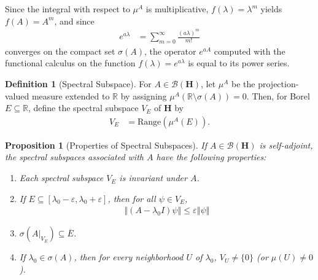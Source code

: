 \documentclass[10pt]{extarticle}
\newcommand{\R}{\mathbb{R}}
\newcommand{\norm}[1]{\left\Vert #1\right\Vert}
\theoremstyle{plain}
\newtheorem*{proposition}{Proposition}%
\theoremstyle{definition}
\newtheorem*{definition}{Definition}
\theoremstyle{remark}
\begin{document}
  Since the integral with respect to $\mu^{A}$ is multiplicative, $f(\lambda) = \lambda^{m}$ yields $f(A) = A^{m}$, and since
  \begin{align*}
    e^{a\lambda} &= \sum_{m=0}^{\infty}\frac{(a\lambda)^{m}}{m!}
  \end{align*}
  converges on the compact set $\sigma(A)$, the operator $e^{aA}$ computed with the functional calculus on the function $f(\lambda) = e^{a\lambda}$ is equal to its power series.
  \begin{definition}[Spectral Subspace]
    For $A\in \mathcal{B}\left(\mathbf{H}\right)$, let $\mu^{A}$ be the projection-valued measure extended to $\R$ by assigning $\mu^{A}\left(\R\setminus \sigma(A)\right) = 0$. Then, for Borel $E\subseteq \R$, define the spectral subspace $V_E$ of $\mathbf{H}$ by
    \begin{align*}
      V_E &= \text{Range}\left(\mu^{A}\left(E\right)\right).
    \end{align*}
  \end{definition}
  \begin{proposition}[Properties of Spectral Subspaces]
    If $A\in \mathcal{B}\left(\mathbf{H}\right)$ is self-adjoint, the spectral subspaces associated with $A$ have the following properties:
    \begin{enumerate}[(1)]
      \item Each spectral subspace $V_E$ is invariant under $A$.
      \item If $E\subseteq [\lambda_0 - \varepsilon, \lambda_0 + \varepsilon]$, then for all $\psi \in V_E$,
        \begin{align*}
          \norm{\left(A-\lambda_0I\right)\psi}\leq \varepsilon \norm{\psi}
        \end{align*}
      \item $\displaystyle \sigma\left(A\rvert_{V_E}\right)\subseteq \overline{E}$.
      \item If $\lambda_0 \in \sigma(A)$, then for every neighborhood $U$ of $\lambda_0$, $V_U \neq \{0\}$ (or $\mu(U)\neq 0$).
    \end{enumerate}
  \end{proposition}
\end{document}
